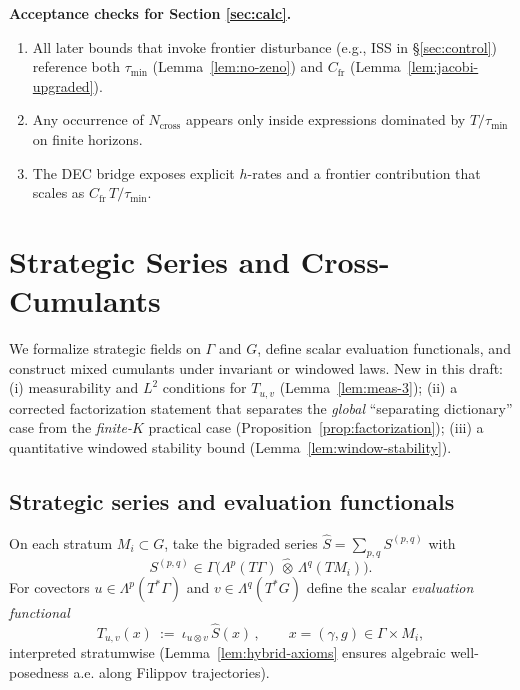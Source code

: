 \documentclass[10pt]{article}
\begin{document}
\begin{mdframed}
\textbf{Acceptance checks for Section \ref{sec:calc}.}
\begin{enumerate}[leftmargin=*]
\item All later bounds that invoke frontier disturbance (e.g., ISS in \S\ref{sec:control}) reference both $\tau_{\min}$ (Lemma~\ref{lem:no-zeno}) and $C_{\mathrm{fr}}$ (Lemma~\ref{lem:jacobi-upgraded}).
\item Any occurrence of $N_{\mathrm{cross}}$ appears only inside expressions dominated by $T/\tau_{\min}$ on finite horizons.
\item The DEC bridge exposes explicit $h$-rates and a frontier contribution that scales as $C_{\mathrm{fr}}\,T/\tau_{\min}$.
\end{enumerate}
\end{mdframed}

\section{Strategic Series and Cross-Cumulants}\label{sec:stoch}

We formalize strategic fields on $\Gamma$ and $G$, define scalar evaluation functionals, and construct mixed cumulants under invariant or windowed laws. New in this draft: (i) measurability and $L^2$ conditions for $T_{u,v}$ (Lemma~\ref{lem:meas-3}); (ii) a corrected factorization statement that separates the \emph{global} “separating dictionary” case from the \emph{finite-$K$} practical case (Proposition~\ref{prop:factorization}); (iii) a quantitative windowed stability bound (Lemma~\ref{lem:window-stability}).

\subsection{Strategic series and evaluation functionals}

On each stratum $M_i\subset G$, take the bigraded series $\hat S=\sum_{p,q}S^{(p,q)}$ with
\[
S^{(p,q)}\in \Gamma\big(\Lambda^p(T\Gamma)\,\hat\otimes\,\Lambda^q(TM_i)\big).
\]
For covectors $u\in\Lambda^p(T^*\Gamma)$ and $v\in\Lambda^q(T^*G)$ define the scalar \emph{evaluation functional}
\[
T_{u,v}(x)\ :=\ \iota_{u\otimes v}\,\hat S(x)\,,
\qquad x=(\gamma,g)\in \Gamma\times M_i,
\]
interpreted stratumwise (Lemma~\ref{lem:hybrid-axioms} ensures algebraic well-posedness a.e. along Filippov trajectories).
\end{document}
